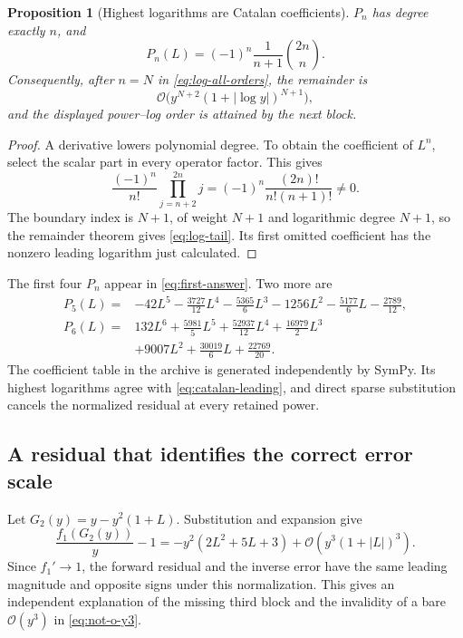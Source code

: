 \documentclass[11pt,a4paper]{article}
\numberwithin{equation}{section}
\newtheorem{proposition}[theorem]{Proposition}
\theoremstyle{definition}
\theoremstyle{remark}
\newcommand{\OO}{\mathcal O}
\begin{document}
\begin{proposition}[Highest logarithms are Catalan coefficients]
$P_n$ has degree exactly $n$, and
\begin{equation}
 [L^n]P_n(L)=(-1)^n\frac{1}{n+1}\binom{2n}{n}.
 \label{eq:catalan-leading}
\end{equation}
Consequently, after $n=N$ in \eqref{eq:log-all-orders}, the remainder is
\begin{equation}
 \OO\bigl(y^{N+2}(1+|\log y|)^{N+1}\bigr),
 \label{eq:log-tail}
\end{equation}
and the displayed power--log order is attained by the next block.
\end{proposition}
\begin{proof}
A derivative lowers polynomial degree. To obtain the coefficient of $L^n$,
select the scalar part in every operator factor. This gives
\[
 \frac{(-1)^n}{n!}\prod_{j=n+2}^{2n}j
 =(-1)^n\frac{(2n)!}{n!(n+1)!}\ne0.
\]
The boundary index is $N+1$, of weight $N+1$ and logarithmic degree $N+1$,
so the remainder theorem gives \eqref{eq:log-tail}. Its first omitted
coefficient has the nonzero leading logarithm just calculated.
\end{proof}

The first four $P_n$ appear in \eqref{eq:first-answer}. Two more are
\begin{align}
 P_5(L)={}&-42L^5-\frac{3727}{12}L^4-\frac{5365}{6}L^3
           -1256L^2-\frac{5177}{6}L-\frac{2789}{12},\label{eq:p5}\\
 P_6(L)={}&132L^6+\frac{5981}{5}L^5+\frac{52937}{12}L^4
          +\frac{16979}{2}L^3\nonumber\\
         &+9007L^2+\frac{30019}{6}L+\frac{22769}{20}.
 \label{eq:p6}
\end{align}
The coefficient table in the archive is generated independently by SymPy.
Its highest logarithms agree with \eqref{eq:catalan-leading}, and direct
sparse substitution cancels the normalized residual at every retained
power.

\subsection{A residual that identifies the correct error scale}

Let $G_2(y)=y-y^2(1+L)$. Substitution and expansion give
\begin{equation}
 \frac{f_1(G_2(y))}{y}-1
 =-y^2(2L^2+5L+3)+\OO(y^3(1+|L|)^3).
 \label{eq:first-residual}
\end{equation}
Since $f_1'\to1$, the forward residual and the inverse error have the same
leading magnitude and opposite signs under this normalization. This gives
an independent explanation of the missing third block and the invalidity
of a bare $\OO(y^3)$ in \eqref{eq:not-o-y3}.
\end{document}
